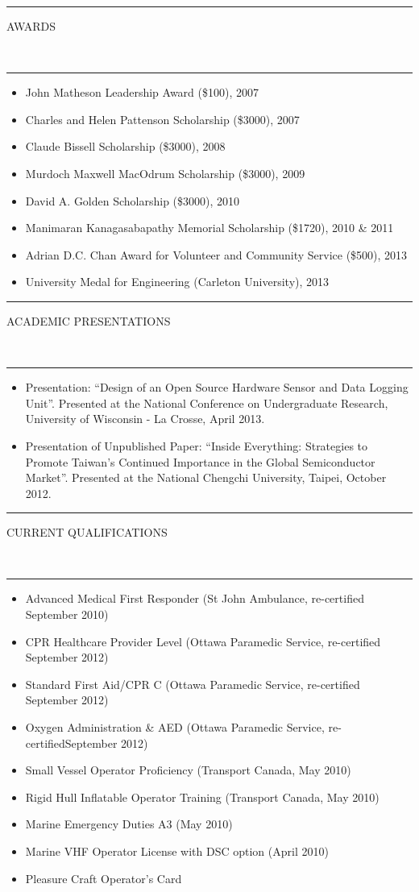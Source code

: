 \documentclass[10pt, letterpaper, oneside]{article}
\newcommand{\HRule}[2]{\textcolor{#1}{\rule{\linewidth}{#2}}}
\newcommand{\sectiontitle}[1]{\begin{minipage}{\textwidth}\HRule{black}{0.25mm}\vspace{-10pt}\begin{center}\Large\MakeUppercase{#1}\end{center}\end{minipage}\\\HRule{light-grey}{0.15mm}\vspace{\baselineskip}}
\newenvironment{tightressection}[1]{
  \begin{minipage}{\textwidth}
  \sectiontitle{#1}}
  {\vspace{\baselineskip}\end{minipage}}
\newenvironment{rescolumn}{
  \begin{minipage}{0.5\textwidth}
    \begin{itemize}[noitemsep,nolistsep]}
  {\end{itemize}
    \end{minipage}}
\newcommand{\resitem}[1]{
    \vspace{2pt}
    \item \begin{flushleft} #1 \end{flushleft}
}
\begin{document}
\begin{tightressection}{awards}
  \begin{rescolumn}
      \resitem{John Matheson Leadership Award (\$100), 2007}
      \resitem{Charles and Helen Pattenson Scholarship (\$3000), 2007}
      \resitem{Claude Bissell Scholarship (\$3000), 2008}
      \resitem{Murdoch Maxwell MacOdrum Scholarship (\$3000), 2009}
    \end{rescolumn}
  \begin{rescolumn}
      \resitem{David A. Golden Scholarship (\$3000), 2010}
      \resitem{Manimaran Kanagasabapathy Memorial Scholarship (\$1720), 2010 \& 2011}
      \resitem{Adrian D.C. Chan Award for Volunteer and Community Service (\$500), 2013}
      \resitem{University Medal for Engineering (Carleton University), 2013}
    \end{rescolumn}
\end{tightressection}
 
\begin{tightressection}{academic presentations}
  \begin{itemize}[noitemsep,nolistsep]
    \resitem{Presentation: ``Design of an Open Source Hardware Sensor and Data Logging Unit''.  Presented at the National Conference on Undergraduate Research, University of Wisconsin - La Crosse, April 2013.}
    \resitem{Presentation of Unpublished Paper: ``Inside Everything: Strategies to Promote Taiwan's Continued Importance in the Global Semiconductor Market''. Presented at the National Chengchi University, Taipei, October 2012.}
  \end{itemize}
\end{tightressection}
 
\begin{tightressection}{current qualifications}
  \begin{rescolumn}
      \resitem{Advanced Medical First Responder (St John Ambulance, re-certified September 2010)}
      \resitem{CPR Healthcare Provider Level (Ottawa Paramedic Service, re-certified September 2012)}
      \resitem{Standard First Aid/CPR C (Ottawa Paramedic Service, re-certified September 2012)}
      \resitem{Oxygen Administration \& AED (Ottawa Paramedic Service, re-certifiedSeptember 2012)}
    \end{rescolumn}
  \begin{rescolumn}
      \resitem{Small Vessel Operator Proficiency (Transport Canada, May 2010)}
      \resitem{Rigid Hull Inflatable Operator Training (Transport Canada, May 2010)}
      \resitem{Marine Emergency Duties A3 (May 2010)}
      \resitem{Marine VHF Operator License with DSC option (April 2010)}
      \resitem{Pleasure Craft Operator's Card}
    \end{rescolumn}
\end{tightressection}
 
\end{document}
